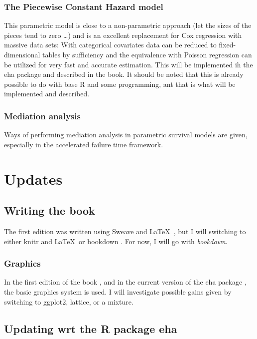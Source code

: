 \documentclass[a4paper,11pt]{article}
\begin{document}
\subsubsection{The Piecewise Constant Hazard model}

This parametric model is close to a non-parametric approach (let the sizes
of the pieces tend to zero \ldots) and is an excellent replacement for Cox
regression with massive data sets: With categorical covariates data can be
reduced to fixed-dimensional tables by sufficiency and the equivalence
with Poisson regression can be utilized for very fast and accurate
estimation. This will be implemented ih the eha package and described in
the book. It should be noted that this is already possible to do with base R
and some programming, ant that is what will be implemented and described.   

\subsubsection{Mediation analysis}

Ways of performing mediation analysis in parametric survival models are
given, especially in the accelerated failure time framework.


\section{Updates} \label{sec:updates}

\subsection{Writing the book}

The first edition was written using Sweave \citep{sweave02} and \LaTeX\
\citep{lamport}, but I will
switching to either knitr \citep{knitr15} and \LaTeX\ or bookdown 
\citep{bookdown16}. For now, I will go with \emph{bookdown}.

\subsubsection{Graphics}

In the first edition of the book \citep{ehar12}, and in the current version
of the eha package \citep{eha}, the basic graphics system is used. I will 
investigate possible gains given by switching to ggplot2, lattice, or a
mixture.


\subsection{Updating wrt the R package eha}
\end{document}
